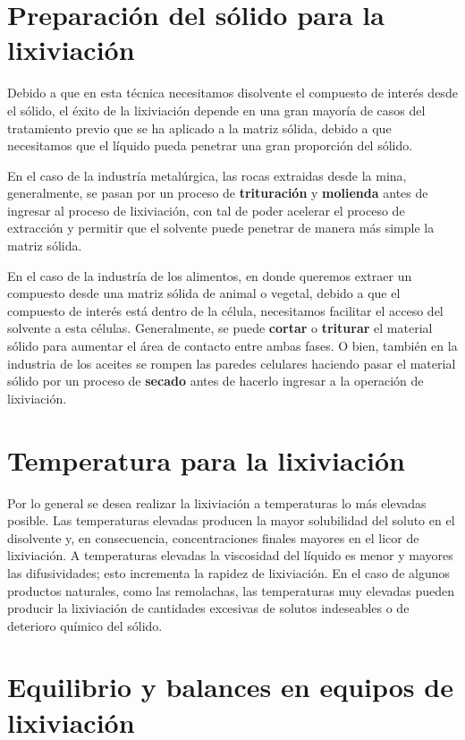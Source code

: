 \documentclass[11pt]{book}
\begin{document}
\section{Preparación del sólido para la lixiviación}

Debido a que en esta técnica necesitamos disolvente el compuesto de interés desde el sólido, el éxito de la lixiviación depende en una gran mayoría de casos del tratamiento previo que se ha aplicado a la matriz sólida, debido a que necesitamos que el líquido pueda penetrar una gran proporción del sólido.

En el caso de la industría metalúrgica, las rocas extraidas desde la mina, generalmente, se pasan por un proceso de \textbf{trituración} y \textbf{molienda} antes de ingresar al proceso de lixiviación, con tal de poder acelerar el proceso de extracción y permitir que el solvente puede penetrar de manera más simple la matriz sólida. 

En el caso de la industría de los alimentos, en donde queremos extraer un compuesto desde una matriz sólida de animal o vegetal, debido a que el compuesto de interés está dentro de la célula, necesitamos facilitar el acceso del solvente a esta células. Generalmente, se puede \textbf{cortar} o \textbf{triturar} el material sólido para aumentar el área de contacto entre ambas fases. O bien, también en la industria de los aceites se rompen las paredes celulares haciendo pasar el material sólido por un proceso de \textbf{secado} antes de hacerlo ingresar a la operación de lixiviación. 

\section{Temperatura para la lixiviación}

Por lo general se desea realizar la lixiviación a temperaturas lo más elevadas posible. Las temperaturas elevadas producen la mayor solubilidad del soluto en el disolvente y, en consecuencia, concentraciones finales mayores en el licor de lixiviación. A temperaturas elevadas la viscosidad del líquido es menor y mayores las difusividades; esto incrementa la rapidez de lixiviación. En el caso de algunos productos naturales, como las remolachas, las temperaturas muy elevadas pueden producir la lixiviación de cantidades excesivas de solutos indeseables o de deterioro químico del sólido.

\section{Equilibrio y balances en equipos de lixiviación}
\end{document}
